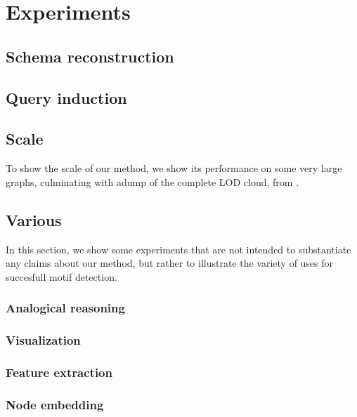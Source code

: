 \documentclass[11pt]{article}
\begin{document}
\section{Experiments}

\subsection{Schema reconstruction}

\subsection{Query induction}

\subsection{Scale}

To show the scale of our method, we show its performance on some very large graphs, culminating with adump of the complete LOD cloud, from \cite{}.

\subsection{Various}


In this section, we show some experiments that are not intended to substantiate any claims about our method, but rather to illustrate the variety of uses for succesfull motif detection. 

\subsubsection{Analogical reasoning}

\subsubsection{Visualization}

\subsubsection{Feature extraction}

\subsubsection{Node embedding}


\end{document}

